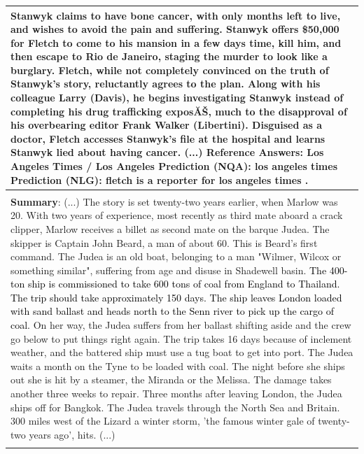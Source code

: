 \documentclass[11pt,a4paper]{article}
\newcommand{\cmark}{\ding{51}}%
\theoremstyle{mydef}
\theoremstyle{myprob}
\begin{document}
\begin{table}[h!]
{\begin{tabular}{p{50em}}
{Stanwyk claims to have bone cancer, with only months left to live, and wishes to avoid the pain and suffering. Stanwyk offers \$50,000 for Fletch to come to his mansion in a few days time, kill him, and then escape to Rio de Janeiro, staging the murder to look like a burglary. Fletch, while not completely convinced on the truth of Stanwyk's story, reluctantly agrees to the plan. Along with his colleague Larry (Davis), he begins investigating Stanwyk instead of completing his drug trafficking exposĂŠ, much to the disapproval of his overbearing editor Frank Walker (Libertini). Disguised as a doctor, Fletch accesses Stanwyk's file at the hospital and learns Stanwyk lied about having cancer. (...) \\
\textbf{Reference Answers}: Los Angeles Times / Los Angeles \\
\textbf{Prediction (NQA)}: los angeles times \cmark \\
\textbf{Prediction (NLG)}: fletch is a reporter for los angeles times .  \cmark
}
\vspace{1pt}
\\ \hline
\vspace{0.5pt}
\pbox{50em}{ %
\textbf{(c) Question}:  How long approximately was the voyage from London to Thailand supposed to take? \\
\textbf{Summary}: 
(...) The story is set twenty-two years earlier, when Marlow was 20. With two years of experience, most recently as third mate aboard a crack clipper, Marlow receives a billet as second mate on the barque Judea. The skipper is Captain John Beard, a man of about 60. 
 This is Beard's first command. The Judea is an old boat, belonging to a man "Wilmer, Wilcox or something similar", suffering from age and disuse in Shadewell basin. \textcolor{black}{The 400-ton ship is commissioned to take 600 tons of coal from England to Thailand. The trip should take approximately 150 days. The ship leaves London loaded with sand ballast and heads north to the Senn river to pick up the cargo of coal.} On her way, the Judea suffers from her ballast shifting aside and the crew go below to put things right again. The trip takes 16 days because of inclement weather, and the battered ship must use a tug boat to get into port. The Judea waits a month on the Tyne to be loaded with coal. %
The night before she ships out she is hit by a steamer, the Miranda or the Melissa. The damage takes another three weeks to repair. Three months after leaving London, the Judea ships off for Bangkok. The Judea travels through the North Sea and Britain. 300 miles west of the Lizard a winter storm, 'the famous winter gale of twenty-two years ago', hits. (...) \\
}
\end{tabular}}
\end{table}
\end{document}
